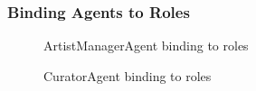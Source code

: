 \documentclass[paper=letter, fontsize=12pt]{article}
\begin{document}
\subsubsection{Binding Agents to Roles}
\begin{figure}[H]
  \begin{center}
    \caption{ArtistManagerAgent binding to roles}
    \label{fig:artistmanageragent_romas}
  \end{center}
\end{figure}
\begin{figure}[H]
  \begin{center}
    \caption{CuratorAgent binding to roles}
    \label{fig:curatoragent_romas}
  \end{center}
\end{figure}
\end{document}
